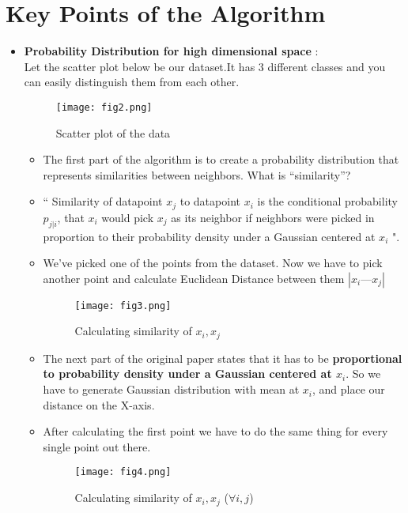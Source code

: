 \documentclass[a4paper, 11pt]{article}
\begin{document}
\section{Key Points of the Algorithm}
\begin{itemize}
    \item \textbf{Probability Distribution for high dimensional space} :\\
    Let the scatter plot below be our dataset.It has 3 different classes and you can easily distinguish them from each other.
    \begin{figure}[h!]
        \centering
        \texttt{[image: fig2.png]}
        \caption{Scatter plot of the data}
        \label{fig:scatter}
      \end{figure}

      \begin{itemize}
       \item The first part of the algorithm is to create a probability distribution that represents similarities between neighbors. What is “similarity”? 
       \item “ Similarity of datapoint $x_j$ to datapoint $x_i$ is the conditional probability $p_{j|i}$, that $x_i$ would pick $x_j$ as its neighbor if neighbors were picked in proportion to their 
       probability density under a Gaussian centered at $x_i$ ".
       \item We’ve picked one of the points from the dataset. Now we have to pick another point and calculate Euclidean Distance between them $|x_i — x_j|$
       \begin{figure}[ht!]
        \centering
        \texttt{[image: fig3.png]}
        \caption{Calculating similarity of $x_i, x_j$}
        \label{fig:gauss}
      \end{figure}
      \item The next part of the original paper states that it has to be \textbf{proportional to probability density under a Gaussian centered at $x_i$}. So we have to generate Gaussian distribution with mean at $x_i$, and place our distance on the X-axis.
      \item After calculating the first point we have to do the same thing for every single point out there.
      \begin{figure}[ht!]
        \centering
        \texttt{[image: fig4.png]}
        \caption{Calculating similarity of $x_i, x_j$ ($\forall i,j$)}
        \label{fig:gauss_all}
      \end{figure}

\end{itemize}
\end{itemize}
\end{document}
